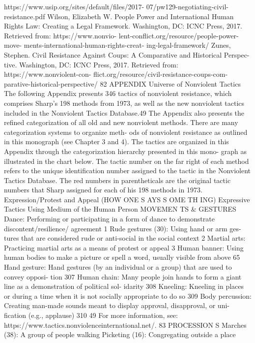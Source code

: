 \documentclass[twoside,a4paper,12pt,fleqn,openany]{extbook}
\begin{document}
https://www.usip.org/sites/default/files/2017-
07/pw129-negotiating-civil-resistance.pdf
Wilson, Elizabeth W. People Power and
International Human Rights Law: Creating a
Legal Framework. Washington, DC: ICNC Press,
2017. Retrieved from: https://www.nonvio-
lent-conflict.org/resource/people-power-move-
ments-international-human-rights-creat-
ing-legal-framework/
Zunes, Stephen. Civil Resistance Against
Coups: A Comparative and Historical Perspec-
tive. Washington, DC: ICNC Press, 2017.
Retrieved from: https://www.nonviolent-con-
flict.org/resource/civil-resistance-coups-com-
parative-historical-perspective/
82
APPENDIX
Universe of Nonviolent Tactics
The following Appendix presents 346 tactics of nonviolent resistance, which comprises
Sharp’s 198 methods from 1973, as well as the new nonviolent tactics included in the
Nonviolent Tactics Database.49 The Appendix also presents the refined categorization of all
old and new nonviolent methods. There are many categorization systems to organize meth-
ods of nonviolent resistance as outlined in this monograph (see Chapter 3 and 4). The tactics
are organized in this Appendix through the categorization hierarchy presented in this mono-
graph as illustrated in the chart below.
The tactic number on the far right of each method refers to the unique identification
number assigned to the tactic in the Nonviolent Tactics Database.
The red numbers in parentheticals are the original tactic numbers that Sharp assigned
for each of his 198 methods in 1973.
Expression/Protest and Appeal
(HOW ONE S AYS S OME TH ING)
Expressive Tactics Using Medium of the Human Person
MOVEMEN TS & GESTURES
Dance: Performing or participating in a form of
dance to demonstrate discontent/resilience/
agreement
 1
Rude gestures (30): Using hand or arm ges-
tures that are considered rude or anti-social in
the social context
 2
Martial arts: Practicing martial arts as a means
of protest or appeal
 3
Human banner: Using human bodies to make
a picture or spell a word, usually visible from
above
 65
Hand gesture: Hand gestures (by an individual
or a group) that are used to convey opposi-
tion
 307
Human chain: Many people join hands to form
a giant line as a demonstration of political sol-
idarity
 308
Kneeling: Kneeling in places or during a time
when it is not socially appropriate to do so		
309
Body percussion: Creating man-made sounds
meant to display approval, disapproval, or uni-
fication (e.g., applause)
 310
49
 For more information, see: https://www.tactics.nonviolenceinternational.net/.
83
PROCESSION S
Marches (38): A group of people walking
 Picketing (16): Congregating outside a place
\end{document}

